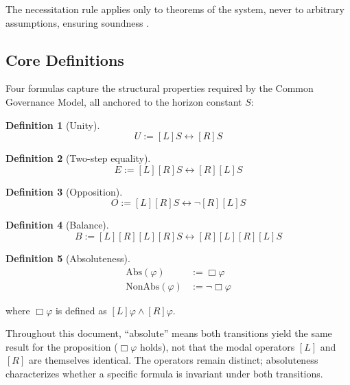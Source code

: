 \documentclass[11pt,a4paper]{article}
\theoremstyle{definition}
\newtheorem{definition}{Definition}
\theoremstyle{remark}
\begin{document}
The necessitation rule applies only to theorems of the system, never to arbitrary assumptions, ensuring soundness \cite{Kripke1963}.

\subsection{Core Definitions}

Four formulas capture the structural properties required by the Common Governance Model, all anchored to the horizon constant $S$:

\begin{definition}[Unity]
\begin{equation}
U := [L]S \leftrightarrow [R]S
\end{equation}
\end{definition}

\begin{definition}[Two-step equality]
\begin{equation}
E := [L][R]S \leftrightarrow [R][L]S
\end{equation}
\end{definition}

\begin{definition}[Opposition]
\begin{equation}
O := [L][R]S \leftrightarrow \neg[R][L]S
\end{equation}
\end{definition}

\begin{definition}[Balance]
\begin{equation}
B := [L][R][L][R]S \leftrightarrow [R][L][R][L]S
\end{equation}
\end{definition}

\begin{definition}[Absoluteness]
\begin{align}
\mathrm{Abs}(\varphi) &:= \Box\varphi \\
\mathrm{NonAbs}(\varphi) &:= \neg\Box\varphi
\end{align}
\end{definition}

where $\Box\varphi$ is defined as $[L]\varphi \land [R]\varphi$.

Throughout this document, ``absolute'' means both transitions yield the same result for the proposition ($\Box\varphi$ holds), not that the modal operators $[L]$ and $[R]$ are themselves identical. The operators remain distinct; absoluteness characterizes whether a specific formula is invariant under both transitions.
\end{document}
